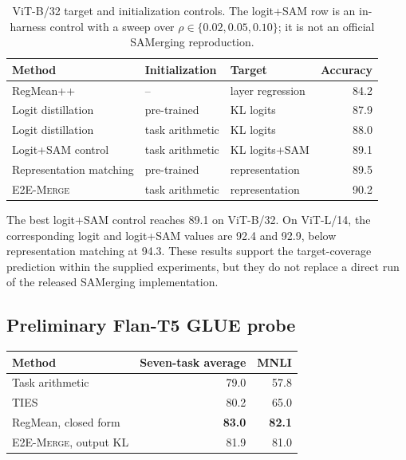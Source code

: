 \documentclass[letterpaper]{article} %
\newcommand{\method}{\textup{\textsc{E2E-Merge}}\xspace}
\theoremstyle{plain}
\theoremstyle{definition}
\begin{document}
\begin{table}[tb]
\centering
{\small
\begin{tabular}{lllr}
\toprule
Method & Initialization & Target & Accuracy \\
\midrule
RegMean++ & -- & layer regression & 84.2 \\
Logit distillation & pre-trained & KL logits & 87.9 \\
Logit distillation & task arithmetic & KL logits & 88.0 \\
Logit+SAM control & task arithmetic & KL logits+SAM & 89.1 \\
Representation matching & pre-trained & representation & 89.5 \\
\method & task arithmetic & representation & 90.2 \\
\bottomrule
\end{tabular}
}
\caption{ViT-B/32 target and initialization controls. The logit+SAM row is an in-harness
control with a sweep over $\rho\in\{0.02,0.05,0.10\}$; it is not an official
SAMerging reproduction.}
\label{tab:distillation-control}
\end{table}

The best logit+SAM control reaches 89.1 on ViT-B/32. On ViT-L/14, the corresponding
logit and logit+SAM values are 92.4 and 92.9, below representation matching at 94.3.
These results support the target-coverage prediction within the supplied experiments,
but they do not replace a direct run of the released SAMerging implementation.

\subsection{Preliminary Flan-T5 GLUE probe}
\label{app:nlp}

{\centering
{\small
\begin{tabular}{lrr}
\toprule
Method & Seven-task average & MNLI \\
\midrule
Task arithmetic & 79.0 & 57.8 \\
TIES & 80.2 & 65.0 \\
RegMean, closed form & \textbf{83.0} & \textbf{82.1} \\
\method, output KL & 81.9 & 81.0 \\
\bottomrule
\end{tabular}
}
\label{tab:nlp}
\par}
\end{document}
